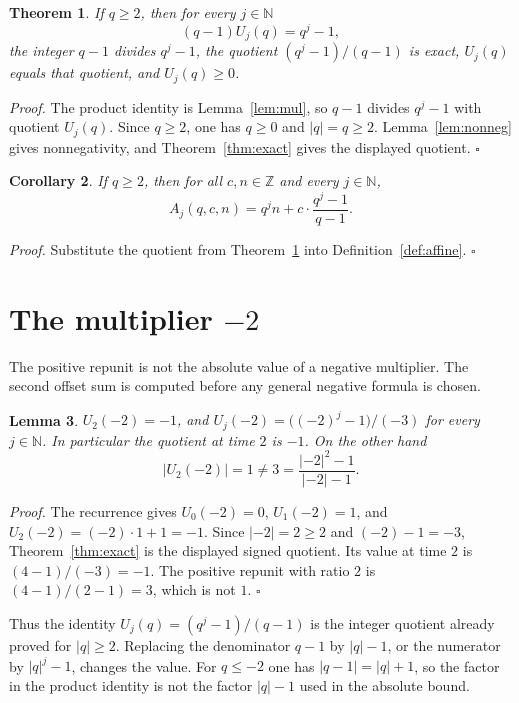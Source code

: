 \documentclass[11pt,letterpaper]{article}
\newcommand{\N}{\mathbb{N}}
\newcommand{\Z}{\mathbb{Z}}
\newtheorem{theorem}{Theorem}
\newtheorem{lemma}[theorem]{Lemma}
\newtheorem{corollary}[theorem]{Corollary}
\newenvironment{proof}{\noindent\textit{Proof.}}{\hfill\(\square\)}
\begin{document}
\begin{theorem}
\label{thm:positive}
If \(q\ge 2\), then for every \(j\in\N\)
\[
(q-1)U_j(q)=q^j-1,
\]
the integer \(q-1\) divides \(q^j-1\), the quotient \((q^j-1)/(q-1)\) is exact, \(U_j(q)\) equals that quotient, and \(U_j(q)\ge 0\).
\end{theorem}

\begin{proof}
The product identity is Lemma~\ref{lem:mul}, so \(q-1\) divides \(q^j-1\) with quotient \(U_j(q)\). Since \(q\ge 2\), one has \(q\ge 0\) and \(|q|=q\ge 2\). Lemma~\ref{lem:nonneg} gives nonnegativity, and Theorem~\ref{thm:exact} gives the displayed quotient.
\end{proof}

\begin{corollary}
\label{cor:affine}
If \(q\ge 2\), then for all \(c,n\in\Z\) and every \(j\in\N\),
\[
A_j(q,c,n)=q^j n+c\cdot\frac{q^j-1}{q-1}.
\]
\end{corollary}

\begin{proof}
Substitute the quotient from Theorem~\ref{thm:positive} into Definition~\ref{def:affine}.
\end{proof}

\section{The multiplier \texorpdfstring{\(-2\)}{-2}}

The positive repunit is not the absolute value of a negative multiplier. The second offset sum is computed before any general negative formula is chosen.

\begin{lemma}
\label{lem:neg-two}
\(U_2(-2)=-1\), and \(U_j(-2)=\bigl((-2)^j-1\bigr)/(-3)\) for every \(j\in\N\). In particular the quotient at time \(2\) is \(-1\). On the other hand
\[
\bigl|U_2(-2)\bigr|=1
\neq 3
=\frac{|-2|^2-1}{|-2|-1}.
\]
\end{lemma}

\begin{proof}
The recurrence gives \(U_0(-2)=0\), \(U_1(-2)=1\), and \(U_2(-2)=(-2)\cdot 1+1=-1\). Since \(|-2|=2\ge 2\) and \((-2)-1=-3\), Theorem~\ref{thm:exact} is the displayed signed quotient. Its value at time \(2\) is \((4-1)/(-3)=-1\). The positive repunit with ratio \(2\) is \((4-1)/(2-1)=3\), which is not \(1\).
\end{proof}

Thus the identity \(U_j(q)=(q^j-1)/(q-1)\) is the integer quotient already proved for \(|q|\ge 2\). Replacing the denominator \(q-1\) by \(|q|-1\), or the numerator by \(|q|^j-1\), changes the value. For \(q\le -2\) one has \(|q-1|=|q|+1\), so the factor in the product identity is not the factor \(|q|-1\) used in the absolute bound.
\end{document}
